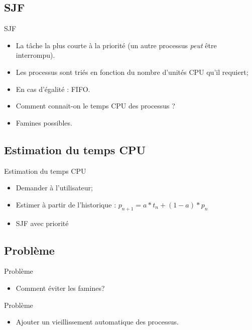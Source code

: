 \begin{frame}{\sectitle}
\def\subsectitle{SJF}
\subsection{\subsectitle}

\begin{block}{\subsectitle}
\begin{itemize}
    \item La tâche la plus courte à la priorité (un autre processus \emph{peut}
    être interrompu).
    \item Les processus sont triés en fonction du nombre d'unités CPU qu'il
    requiert;
    \item En cas d'égalité : FIFO.
    \item Comment connait-on le temps CPU des processus ?
    \item Famines possibles.
\end{itemize}
\end{block}


\def\subsectitle{Estimation du temps CPU}
\subsection{\subsectitle}

\begin{block}{\subsectitle}
\begin{itemize}
    \item Demander à l'utilisateur;
    \item Estimer à partir de l'historique : $p_{n+1} = a*t_{n}+(1-a)*p_{n}$
    \item SJF avec priorité
\end{itemize}
\end{block}
\end{frame}

\begin{frame}{\sectitle}
\def\subsectitle{Problème}
\subsection{\subsectitle}

\begin{alertblock}{\subsectitle}
\begin{itemize}
    \item Comment éviter les famines?
\end{itemize}
\end{alertblock}


\begin{exampleblock}{\subsectitle}
\begin{itemize}
    \item Ajouter un vieillissement automatique des processus.
\end{itemize}
\end{exampleblock}
\end{frame}


